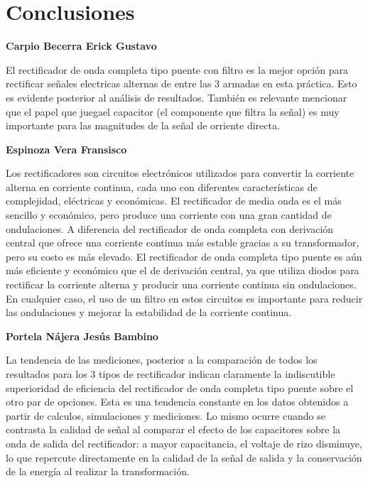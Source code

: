 \documentclass[12pt]{article}
\begin{document}
        \section*{Conclusiones}
        \label{sec:conclusiones}
        \textbf{Carpio Becerra Erick Gustavo}\par
        El rectificador de onda completa tipo puente con filtro es la mejor opción para rectificar
        señales electricas alternas de entre las 3 armadas en esta práctica. Esto es evidente posterior 
        al análisis de resultados. También es relevante mencionar que el papel que juegael  capacitor (el componente que filtra la señal)
        es muy importante para las magnitudes de la señal de orriente directa.\par
        \textbf{Espinoza Vera Fransisco}\par Los rectificadores son circuitos electrónicos utilizados para convertir la corriente alterna en corriente continua, cada uno con diferentes características de complejidad, eléctricas y económicas. El rectificador de media onda es el más sencillo y económico, pero produce una corriente con una gran cantidad de ondulaciones. A diferencia del rectificador de onda completa con derivación central que ofrece una corriente continua más estable gracias a su transformador, pero su costo es más elevado. El rectificador de onda completa tipo puente es aún más eficiente y económico que el de derivación central, ya que utiliza diodos para rectificar la corriente alterna y producir una corriente continua sin ondulaciones. En cualquier caso, el uso de un filtro en estos circuitos es importante para reducir las ondulaciones y mejorar la estabilidad de la corriente continua.
        \par
        \textbf{Portela Nájera Jesús Bambino}\par
        La tendencia de las mediciones, posterior a la comparación de todos los resultados 
        para los 3 tipos de rectificador indican claramente la indiscutible superioridad de eficiencia
        del rectificador de onda completa tipo puente sobre el otro par de opciones. Esta es 
        una tendencia constante en los datos obtenidos a partir de calculos, simulaciones y 
        mediciones. Lo mismo ocurre cuando se contrasta la calidad de señal al comparar el efecto de 
        los capacitores sobre la onda de salida del rectificador: a mayor capacitancia, el voltaje de
        rizo disminuye, lo que repercute directamente en la calidad de la señal de salida y la conservación
        de la energía al realizar la transformación.
\end{document}
